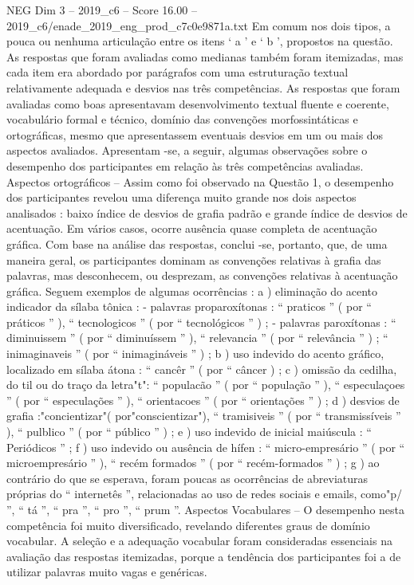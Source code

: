 \begin{textsample}{NEG Dim 3 – 2019\_c6 – Score 16.00 – 2019\_c6/enade\_2019\_eng\_prod\_c7c0e9871a.txt}
Em comum nos dois tipos, a pouca ou nenhuma articulação entre os itens ‘ a ’ e ‘ b ’, propostos na questão.
As respostas que foram avaliadas como medianas também foram itemizadas, mas cada item era abordado por parágrafos com uma estruturação textual relativamente adequada e desvios nas três competências.
As respostas que foram avaliadas como boas apresentavam desenvolvimento textual fluente e coerente, vocabulário formal e técnico, domínio das convenções morfossintáticas e ortográficas, mesmo que apresentassem eventuais desvios em um ou mais dos aspectos avaliados.
Apresentam -se, a seguir, algumas observações sobre o desempenho dos participantes em relação às três competências avaliadas.
Aspectos ortográficos – Assim como foi observado na Questão 1, o desempenho dos participantes revelou uma diferença muito grande nos dois aspectos analisados : baixo índice de desvios de grafia padrão e grande índice de desvios de acentuação.
Em vários casos, ocorre ausência quase completa de acentuação gráfica.
Com base na análise das respostas, conclui -se, portanto, que, de uma maneira geral, os participantes dominam as convenções relativas à grafia das palavras, mas desconhecem, ou desprezam, as convenções relativas à acentuação gráfica.
Seguem exemplos de algumas ocorrências : a ) eliminação do acento indicador da sílaba tônica : - palavras proparoxítonas : “ praticos ” ( por “ práticos ” ), “ tecnologicos ” ( por “ tecnológicos ” ) ; - palavras paroxítonas : “ diminuissem ” ( por “ diminuíssem ” ), “ relevancia ” ( por “ relevância ” ) ; “ inimaginaveis ” ( por “ inimagináveis ” ) ; b ) uso indevido do acento gráfico, localizado em sílaba átona : “ cancêr ” ( por “ câncer ) ; c ) omissão da cedilha, do til ou do traço da letra"t": “ populacão ” ( por “ população ” ), “ especulaçoes ” ( por “ especulações ” ), “ orientacoes ” ( por “ orientações ” ) ; d ) desvios de grafia :"concientizar"( por"conscientizar"), “ tramisiveis ” ( por “ transmissíveis ” ), “ pulblico ” ( por “ público ” ) ; e ) uso indevido de inicial maiúscula : “ Periódicos ” ; f ) uso indevido ou ausência de hífen : “ micro-empresário ” ( por “ microempresário ” ), “ recém formados ” ( por “ recém-formados ” ) ; g ) ao contrário do que se esperava, foram poucas as ocorrências de abreviaturas próprias do “ internetês ”, relacionadas ao uso de redes sociais e emails, como"p/ ”, “ tá ”, “ pra ”, “ pro ”, “ prum ”.
Aspectos Vocabulares – O desempenho nesta competência foi muito diversificado, revelando diferentes graus de domínio vocabular.
A seleção e a adequação vocabular foram consideradas essenciais na avaliação das respostas itemizadas, porque a tendência dos participantes foi a de utilizar palavras muito vagas e genéricas.

\end{textsample}
